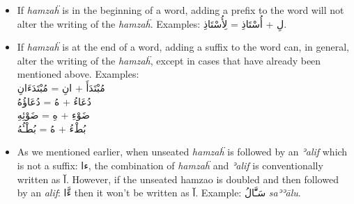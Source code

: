 \documentclass[
  10pt,
]{book}
\begin{document}
\begin{itemize}
\item
  If \emph{hamzaḧ} is in the beginning of a word, adding a prefix to the word will not alter the writing of the \emph{hamzaḧ}. Examples: \foreignlanguage{arabic}{لِ + أُسْتَاذِ = لِأُسْتَاذِ}.
\item
  If \emph{hamzaḧ} is at the end of a word, adding a suffix to the word can, in general, alter the writing of the \emph{hamzaḧ}, except in cases that have already been mentioned above. Examples:\\
  \foreignlanguage{arabic}{مُبْتَدَأَ + انِ = مُبْتَدَءَانِ}\\
  \foreignlanguage{arabic}{دُعَاءُ + هُ = دُعَاؤُهُ}\\
  \foreignlanguage{arabic}{ضَوْءِ + هِ = ضَوْئِهِ}\\
  \foreignlanguage{arabic}{بُطْءُ + هُ = بُطْـُٔهُ}
\item
  As we mentioned earlier, when unseated \emph{hamzaḧ} is followed by an \emph{ʾalif} which is not a suffix: \foreignlanguage{arabic}{ءا}, the combination of \emph{hamzaḧ} and \emph{ʾalif} is conventionally written as \foreignlanguage{arabic}{آ}. However, if the unseated hamzao is doubled and then followed by an \emph{alif}: \foreignlanguage{arabic}{ءَّا} then it won't be written as \foreignlanguage{arabic}{آ}. Example: \foreignlanguage{arabic}{سَـَّٔالُ} \emph{saʾʾālu}.
\end{itemize}
\end{document}
